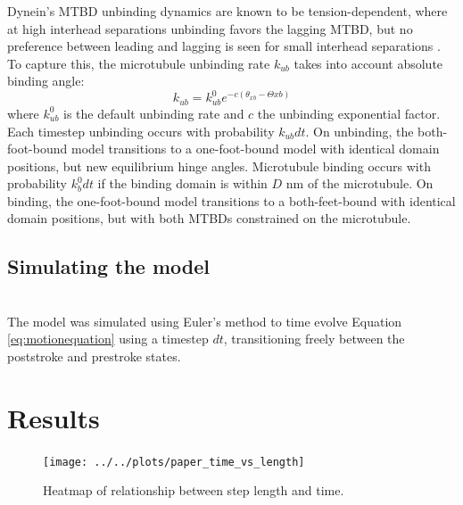 \documentclass[9pt,twocolumn,twoside]{pnas-new}
\begin{document}
Dynein's MTBD unbinding dynamics are known to be tension-dependent, where at high interhead separations unbinding favors the lagging MTBD, but no preference between leading and lagging is seen for small interhead separations \cite{yildizpaper}. To capture this, the microtubule unbinding rate $k_{ub}$ takes into account absolute binding angle:
%
\begin{equation}
  k_{ub} = k_{ub}^0e^{-c\left(\theta_{xb}-\Theta{xb}\right)}
\end{equation}
%
where $k_{ub}^0$ is the default unbinding rate and $c$ the unbinding exponential factor. Each timestep unbinding occurs with probability $k_{ub}dt$. On unbinding, the both-foot-bound model transitions to a one-foot-bound model with identical domain positions, but new equilibrium hinge angles. Microtubule binding occurs with probability $k_{b}^0dt$ if the binding domain is within $D$ nm of the microtubule. On binding, the one-foot-bound model transitions to a both-feet-bound with identical domain positions, but with both MTBDs constrained on the microtubule.\\

\subsection*{Simulating the model}~\\
The model was simulated using Euler's method to time evolve Equation \ref{eq:motionequation} using a timestep $dt$, transitioning freely between the poststroke and prestroke states.

\section{Results}

\begin{figure}[tbhp]
\centering
\texttt{[image: ../../plots/paper\_time\_vs\_length]}
\caption{Heatmap of relationship between step length and time.}
\label{fig:duration-length}
\end{figure}

\end{document}
